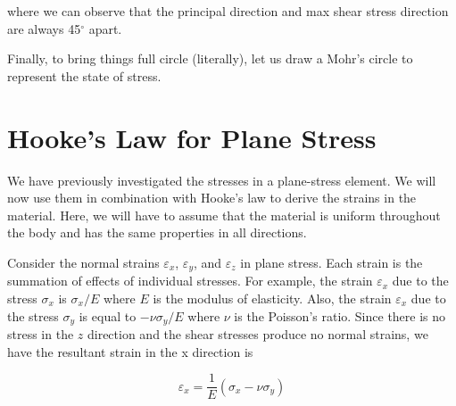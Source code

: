 \documentclass[
10pt,
a4paper,
openany,
svgnames,
]{book} %
\begin{document}
\begin{solution}
  where we can observe that the principal direction and max shear stress direction are always 45$^{\circ}$ apart.

  Finally, to bring things full circle (literally), let us draw a Mohr's circle to represent the state of stress.

  \begin{figure}[H]
    \centering
  \end{figure}
\end{solution}

\section{Hooke’s Law for Plane Stress}

We have previously investigated the stresses in a plane-stress element. We will now use them in combination with Hooke’s law to derive the strains in the material. Here, we will have to assume that the material is uniform throughout the body and has the same properties in all directions.

Consider the normal strains $\varepsilon_x$, $\varepsilon_y$, and $\varepsilon_z$ in plane stress. Each strain is the summation of effects of individual stresses. For example, the strain $\varepsilon_x$ due to the stress $\sigma_x$ is $\sigma_x / E$ where $E$ is the modulus of elasticity. Also, the strain $\varepsilon_x$ due to the stress $\sigma_y$ is equal to $-\nu \sigma_y / E$ where $\nu$ is the Poisson’s ratio. Since there is no stress in the $z$ direction and the shear stresses produce no normal strains, we have the resultant strain in the x direction is

\begin{equation} \label{eqn: plane stress x}
  \varepsilon_x = \frac{1}{E}(\sigma_x - \nu \sigma_y)
\end{equation}
\end{document}
